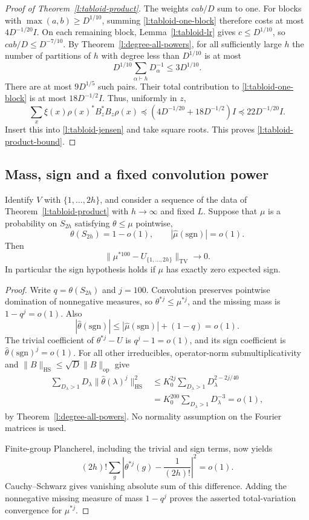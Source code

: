 \begin{proof}[Proof of Theorem~\ref{l:tabloid-product}]
The weights $cab/D$ sum to one.  For blocks with
$\max(a,b)\ge D^{1/10}$, summing
\eqref{l:tabloid-one-block} therefore costs at most
$4D^{-1/20}I$.  On each remaining block,
Lemma~\ref{l:tabloid-lr} gives $c\le D^{1/10}$, so
$cab/D\le D^{-7/10}$.  By
Theorem~\ref{l:degree-all-powers}, for all sufficiently large $h$
the number of partitions of $h$ with degree less than $D^{1/10}$
is at most
\[
 D^{1/10}\sum_{\alpha\vdash h}D_\alpha^{-1}
 \le3D^{1/10}.
\]
There are at most $9D^{1/5}$ such pairs.  Their total
contribution to \eqref{l:tabloid-one-block} is at most
$18D^{-1/2}I$.  Thus, uniformly in $z$,
\[
 \sum_x\xi(x)\rho(x)^*B_z^*B_z\rho(x)
 \preceq(4D^{-1/20}+18D^{-1/2})I
 \preceq22D^{-1/20}I.
\]
Insert this into \eqref{l:tabloid-jensen} and take square roots.
This proves \eqref{l:tabloid-product-bound}.
\end{proof}

\subsection{Mass, sign and a fixed convolution power}

\begin{corollary}
\label{l:tabloid-completion}
Identify $V$ with $\{1,\ldots,2h\}$, and consider a sequence of
the data of Theorem~\ref{l:tabloid-product} with $h\to\infty$
and fixed $L$.
Suppose that $\mu$ is a probability on $S_{2h}$ satisfying
$\theta\le\mu$ pointwise,
\[
 \theta(S_{2h})=1-o(1),\qquad
 \left|\widehat\mu(\mathrm{sgn})\right|=o(1).
\]
Then
\[
 \|\mu^{*100}-U_{\{1,\ldots,2h\}}\|_{\mathrm{TV}}
 \longrightarrow0.
\]
In particular the sign hypothesis holds if $\mu$ has exactly
zero expected sign.
\end{corollary}

\begin{proof}
Write $q=\theta(S_{2h})$ and $j=100$.  Convolution preserves
pointwise domination of nonnegative measures, so
$\theta^{*j}\le\mu^{*j}$, and the missing mass is $1-q^j=o(1)$.
Also
\[
 |\widehat\theta(\mathrm{sgn})|
 \le |\widehat\mu(\mathrm{sgn})|+(1-q)=o(1).
\]
The trivial coefficient of $\theta^{*j}-U$ is $q^j-1=o(1)$,
and its sign coefficient is $\widehat\theta(\mathrm{sgn})^j=o(1)$.
For all other irreducibles, operator-norm submultiplicativity
and $\|B\|_{\mathrm{HS}}\le\sqrt D\|B\|_{\mathrm{op}}$
give
\begin{align*}
 \sum_{D_\lambda>1}D_\lambda
        \|\widehat\theta(\lambda)^j\|_{\mathrm{HS}}^2
 &\le K_0^{2j}\sum_{D_\lambda>1}D_\lambda^{2-2j/40}\\
 &=K_0^{200}\sum_{D_\lambda>1}D_\lambda^{-3}=o(1),
\end{align*}
by Theorem~\ref{l:degree-all-powers}.  No normality assumption
on the Fourier matrices is used.

Finite-group Plancherel, including the trivial and sign terms,
now yields
\[
 (2h)!\sum_g\left|\theta^{*j}(g)-\frac1{(2h)!}\right|^2=o(1).
\]
Cauchy--Schwarz gives vanishing absolute sum of this difference.
Adding the nonnegative missing measure of mass $1-q^j$ proves
the asserted total-variation convergence for $\mu^{*j}$.
\end{proof}
